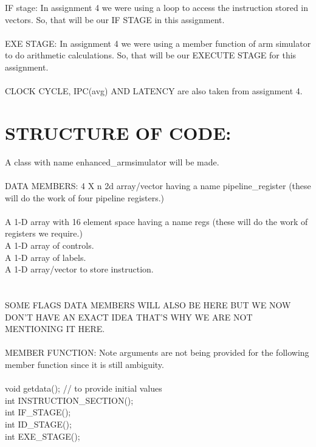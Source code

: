 \documentclass{scrreprt}
\begin{document}
            IF stage: In assignment 4 we were using a loop to access the instruction stored in vectors. So, that will be our IF
            STAGE in this assignment.
\\
\\  

            EXE STAGE: In assignment 4 we were using a member function of arm simulator to do arithmetic calculations. So, that 
            will be our EXECUTE STAGE for this assignment.
\\
\\
            CLOCK CYCLE, IPC(avg) AND LATENCY are also taken from assignment 4.
\\
$ $

\section{STRUCTURE OF CODE:}
$ $
\\
 A class with name enhanced_armsimulator will be made. \\
 \\      DATA MEMBERS: 4 X n 2d array/vector having a name pipeline_register (these will do the work of four pipeline registers.)\\
 \\
\indent A 1-D array with 16 element space having a name regs (these will do the work of registers we require.)\\
\indent A 1-D array of controls.\\
\indent A 1-D array of labels.\\
\indent A 1-D array/vector to store instruction.\\
\\
\\
SOME FLAGS DATA MEMBERS WILL ALSO BE HERE BUT WE NOW DON'T HAVE AN EXACT IDEA THAT'S WHY WE ARE NOT MENTIONING IT HERE.\\
\\
MEMBER FUNCTION: Note arguments are not being provided for the following member function since it is still ambiguity.
\\
\\
\indent                     void getdata(); // to provide initial values\\
\indent                     int INSTRUCTION_SECTION();\\
\indent						int IF_STAGE();\\
\indent                     int ID_STAGE();\\
\indent                     int EXE_STAGE();\\
\end{document}
